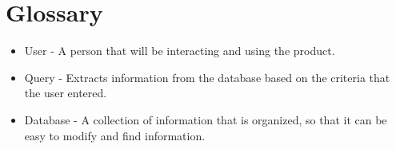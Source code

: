 \documentclass[letterpaper,10pt,titlepag,e draftclsnofoot,onecolumn]{IEEEtran}
\begin{document}
\section{Glossary}
\begin{itemize}
\item User - A person that will be interacting and using the product.
\item Query - Extracts information from the database based on the criteria that the user entered.
\item Database - A collection of information that is organized, so that it can be easy to modify and find information. 
\end{itemize}
\end{document}
